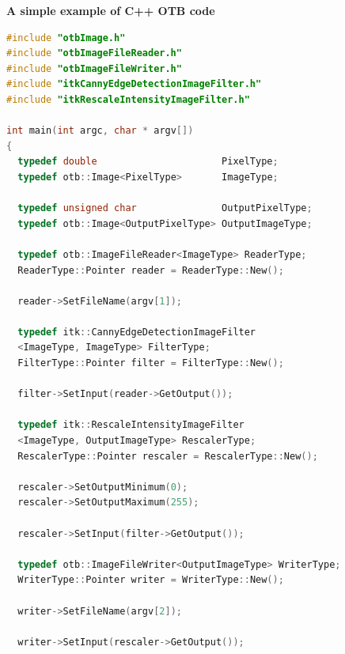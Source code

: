 \documentclass[portrait,a0]{a0poster}
\newenvironment{poster}{
  \begin{center}
  \begin{minipage}[c]{0.99\textwidth}
}{
  \end{minipage} 
  \end{center}
}
\newcommand{\titresection}[1]{ 
 	\begin{center}
 	\huge \textbf{\color{c2}{#1}}
 	
 	

 	
 	\end{center}
 }
\newcommand{\titresubsection}[1]{ 
 	\begin{center}
 	\Large{\textbf{#1}}
 	\end{center}
 }
\begin{document}
\begin{poster}
\begin{minipage}[t]{\textwidth}
\titresection{\sc What does Orfeo ToolBox look like ?}
\vspace{0.5cm}
\begin{minipage}[t]{0.33\textwidth}
\begin{minipage}[t]{\textwidth}
\titresubsection{A simple example of C++ OTB code}
\begin{lstlisting}[language=c++,breaklines=true,breakatwhitespace=true,frame = tb,framerule = 0.25pt,fontadjust,backgroundcolor={\color{listlightgray}},basicstyle = {\ttfamily\scriptsize},keywordstyle = {\ttfamily\color{listkeyword}\textbf},identifierstyle = {\ttfamily},commentstyle = {\ttfamily\color{listcomment}\textit},stringstyle = {\ttfamily},showstringspaces = false,showtabs = false,numbers = none,numbersep = 6pt, numberstyle={\ttfamily\color{listnumbers}},tabsize = 2]
#include "otbImage.h"
#include "otbImageFileReader.h"
#include "otbImageFileWriter.h"
#include "itkCannyEdgeDetectionImageFilter.h"
#include "itkRescaleIntensityImageFilter.h"

int main(int argc, char * argv[])
{
  typedef double                      PixelType;
  typedef otb::Image<PixelType>       ImageType;
  
  typedef unsigned char               OutputPixelType;
  typedef otb::Image<OutputPixelType> OutputImageType;

  typedef otb::ImageFileReader<ImageType> ReaderType;
  ReaderType::Pointer reader = ReaderType::New();

  reader->SetFileName(argv[1]);

  typedef itk::CannyEdgeDetectionImageFilter
  <ImageType, ImageType> FilterType;
  FilterType::Pointer filter = FilterType::New();

  filter->SetInput(reader->GetOutput());

  typedef itk::RescaleIntensityImageFilter
  <ImageType, OutputImageType> RescalerType;
  RescalerType::Pointer rescaler = RescalerType::New();

  rescaler->SetOutputMinimum(0);
  rescaler->SetOutputMaximum(255);

  rescaler->SetInput(filter->GetOutput());

  typedef otb::ImageFileWriter<OutputImageType> WriterType;
  WriterType::Pointer writer = WriterType::New();

  writer->SetFileName(argv[2]);
  
  writer->SetInput(rescaler->GetOutput());


\end{lstlisting}
\end{minipage}
\end{minipage}
\end{minipage}
\end{poster}
\end{document}
